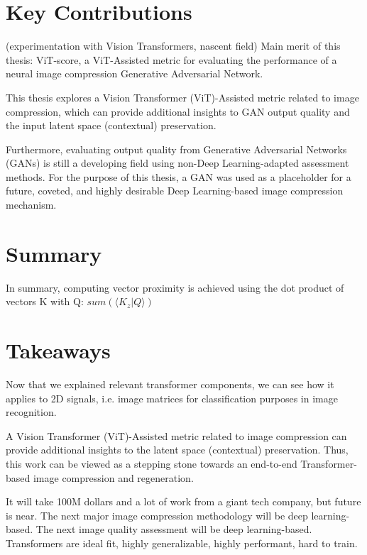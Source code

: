 \section{Key Contributions}

(experimentation with Vision Transformers, nascent field)
Main merit of this thesis:
ViT-score, a ViT-Assisted metric for evaluating the performance of a neural image compression
Generative Adversarial Network.

This thesis explores a Vision Transformer (ViT)-Assisted metric related to 
image compression, which can provide 
additional insights to GAN output quality and the input latent space (contextual) preservation.

Furthermore, evaluating output quality from Generative Adversarial Networks (GANs) is 
still a developing field using non-Deep Learning-adapted assessment methods. 
For the purpose of this thesis, a GAN was used as a placeholder 
for a future, coveted, and highly desirable Deep Learning-based image compression mechanism. 


\section{Summary}

In summary, computing vector proximity is achieved using the dot product of vectors K with Q: $ \displaystyle sum(\langle K_z \vert Q \rangle) $



\section{Takeaways}

Now that we explained relevant transformer components, we can see how it applies to 
2D signals, i.e. image matrices for classification purposes in image recognition.

A Vision Transformer (ViT)-Assisted metric related to image compression can provide 
additional insights to the latent space (contextual) preservation.
Thus, this work can be viewed as a stepping stone towards an end-to-end Transformer-based
image compression and regeneration.

It will take 100M dollars and a lot of work from a giant tech company, but
future is near. The next major image compression methodology will be deep learning-based.
The next image quality assessment will be deep learning-based.
Transformers are ideal fit, highly generalizable, highly performant, hard to train.


